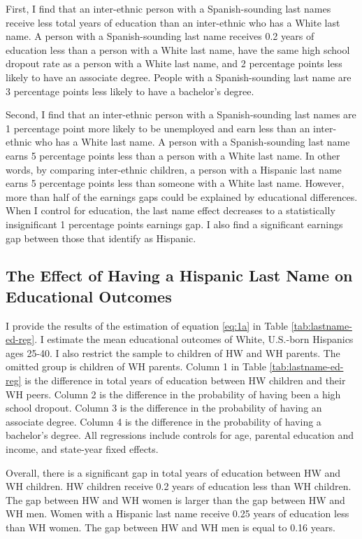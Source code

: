 First, I find that an inter-ethnic person with a Spanish-sounding last names receive less total years of education than an inter-ethnic who has a White last name. A person with a Spanish-sounding last name receives 0.2 years of education less than a person with a White last name, have the same high school dropout rate as a person with a White last name, and 2 percentage points less likely to have an associate degree. People with a Spanish-sounding last name are 3 percentage points less likely to have a bachelor's degree.   

Second, I find that an inter-ethnic person with a Spanish-sounding last names are 1 percentage point more likely to be unemployed and earn less than an inter-ethnic who has a White last name. A person with a Spanish-sounding last name earns 5 percentage points less than a person with a White last name. In other words, by comparing inter-ethnic children, a person with a Hispanic last name earns 5 percentage points less than someone with a White last name. However, more than half of the earnings gaps could be explained by educational differences. When I control for education, the last name effect decreases to a statistically insignificant 1 percentage points earnings gap. I also find a significant earnings gap between those that identify as Hispanic. 

\subsection{The Effect of Having a Hispanic Last Name on Educational Outcomes}

I provide the results of the estimation of equation \ref{eq:1a} in Table \ref{tab:lastname-ed-reg}. I estimate the mean educational outcomes of White, U.S.-born Hispanics ages 25-40. I also restrict the sample to children of HW and WH parents. The omitted group is children of WH parents. Column 1 in Table \ref{tab:lastname-ed-reg} is the difference in total years of education between HW children and their WH peers. Column 2 is the difference in the probability of having been a high school dropout. Column 3 is the difference in the probability of having an associate degree. Column 4 is the difference in the probability of having a bachelor's degree. All regressions include controls for age, parental education and income, and state-year fixed effects.

Overall, there is a significant gap in total years of education between HW and WH children. HW children receive 0.2 years of education less than WH children. The gap between HW and WH women is larger than the gap between HW and WH men. Women with a Hispanic last name receive 0.25 years of education less than WH women. The gap between HW and WH men is equal to 0.16 years.

